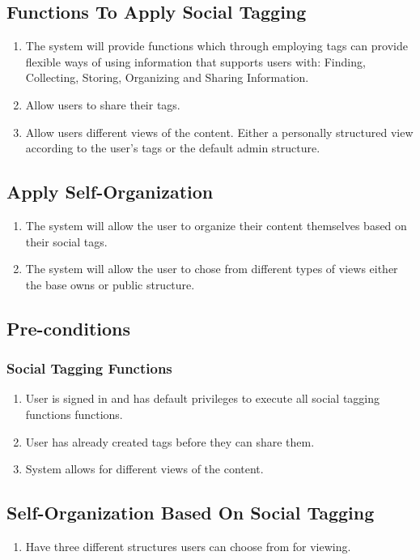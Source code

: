 \documentclass[12pt, oneside]{book}
\begin{document}
\subsection{Functions To Apply Social Tagging}
\begin{enumerate}
\item The system will provide functions which through employing tags can provide flexible ways of using information that supports users with: Finding, Collecting, Storing, Organizing and Sharing Information.
\item Allow users to share their tags.
\item Allow users different views of the content. Either a personally structured view according to the user's tags or the default admin structure.
\end{enumerate}
\subsection{Apply Self-Organization}
\begin{enumerate}
\item The system will allow the user to organize their content themselves based on their social tags.
\item The system will allow the user to chose from different types of views either the base owns or public structure.
\end{enumerate}
\subsection{Pre-conditions}
\subsubsection{Social Tagging Functions}    
\begin{enumerate}
\item User is signed in and has default privileges to execute all social tagging functions functions.
\item User has already created tags before they can share them.
\item  System allows for different views of the content.
\end{enumerate}
\subsection{Self-Organization Based On Social Tagging}
\begin{enumerate}
\item Have three different structures users can choose from for viewing.
\end{enumerate}
\end{document}
